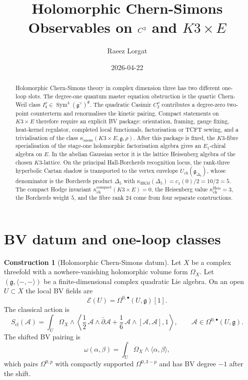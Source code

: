 \documentclass[11pt]{amsart}
\title{Holomorphic Chern-Simons Observables on $C^3$ and $K3\times E$}
\author{Raeez Lorgat}
\date{2026-04-22}
\providecommand{\dbar}{\bar{\partial}}
\providecommand{\gfrak}{\mathfrak{g}}
\providecommand{\Sym}{\operatorname{Sym}}
\providecommand{\cA}{\mathcal{A}}
\providecommand{\cE}{\mathcal{E}}
\providecommand{\Eone}{E_1}
\providecommand{\frakgDelta}{\mathfrak{g}_{\Delta_5}}
\providecommand{\kanom}{\kappa_{\operatorname{anom}}}
\providecommand{\kchc}{\kappa_{\mathrm{ch}}^{\mathrm{compact}}}
\providecommand{\kchH}{\kappa_{\mathrm{ch}}^{\mathrm{Heis}}}
\providecommand{\kBKM}{\kappa_{\mathrm{BKM}}}
\theoremstyle{plain}
\theoremstyle{definition}
\newtheorem{construction}[theorem]{Construction}
\theoremstyle{remark}
\begin{document}
\maketitle

\begin{abstract}
Holomorphic Chern-Simons theory in complex dimension three has two
different one-loop slots.  The degree-one quantum master equation
obstruction is the quartic Chern-Weil class
\(I_4^\rho\in\Sym^4(\gfrak^\vee)^{\gfrak}\).  The quadratic Casimir
\(C_2^\rho\) contributes a degree-zero two-point counterterm and
renormalises the kinetic pairing.  Compact statements on
\(K3\times E\) therefore require an explicit BV package: orientation,
framing, gauge fixing, heat-kernel regulator, completed local
functionals, factorisation or TCFT sewing, and a trivialisation of the
class \(\kanom(K3\times E,\gfrak,\rho)\).  After this package is fixed,
the \(K3\)-fibre specialisation of the stage-one holomorphic
factorisation algebra gives an \(\Eone\)-chiral algebra on \(E\).  In
the abelian Gaussian sector it is the lattice Heisenberg algebra of the
chosen \(K3\)-lattice.  On the principal Hall-Borcherds recognition
locus, the rank-three hyperbolic Cartan shadow is transported to the
vertex envelope \(U_{\mathrm{ch}}(\frakgDelta)\), whose denominator is
the Borcherds product \(\Delta_5\) with
\(\kBKM(\Delta_5)=c_1(0)/2=10/2=5\).  The compact Hodge invariant
\(\kchc(K3\times E)=0\), the Heisenberg value \(\kchH=3\), the
Borcherds weight \(5\), and the fibre rank \(24\) come from four
separate constructions.
\end{abstract}

\tableofcontents

\section{BV datum and one-loop classes}
\label{sec:bv-datum}

\begin{construction}[Holomorphic Chern-Simons datum]
\label{cons:hcs-datum}
Let \(X\) be a complex threefold with a nowhere-vanishing holomorphic
volume form \(\Omega_X\).  Let \((\gfrak,\langle-,-\rangle)\) be a
finite-dimensional complex quadratic Lie algebra.  On an open
\(U\subset X\) the local BV fields are
\[
  \cE(U)=\Omega^{0,\bullet}(U,\gfrak)[1].
\]
The classical action is
\[
  S_{\mathrm{cl}}(\cA)=
  \int_U \Omega_X\wedge
  \left\langle
    \frac12\,\cA\wedge\dbar\cA+
    \frac16\,\cA\wedge[\cA,\cA],
    1
  \right\rangle ,
  \qquad
  \cA\in\Omega^{0,\bullet}(U,\gfrak).
\]
The shifted BV pairing is
\[
  \omega(\alpha,\beta)=
  \int_U\Omega_X\wedge\langle\alpha,\beta\rangle ,
\]
which pairs \(\Omega^{0,p}\) with compactly supported
\(\Omega^{0,3-p}\) and has BV degree \(-1\) after the shift.
\end{construction}
\end{document}
